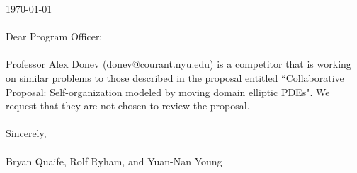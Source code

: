 \documentclass[11pt]{article}
\begin{document}
\sloppy

\noindent
\today \\ \\
Dear Program Officer:
\\ \\
Professor Alex Donev (donev@courant.nyu.edu) is a competitor that is
working on similar problems to those described in the proposal entitled
``Collaborative Proposal: Self-organization modeled by moving domain
elliptic PDEs". We request that they are not chosen to review the
proposal.
\\ \\
Sincerely, \\ \\
Bryan Quaife, Rolf Ryham, and Yuan-Nan Young
\end{document}
